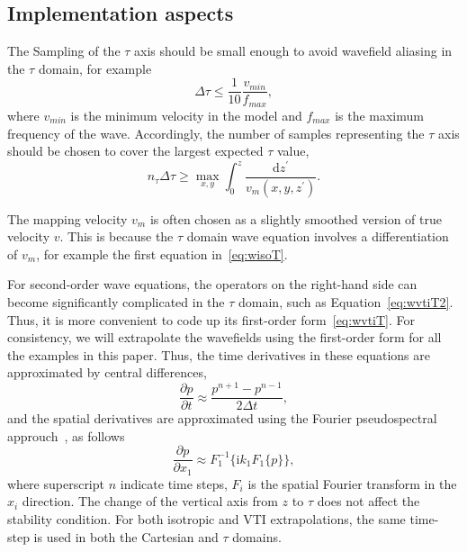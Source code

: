 \subsection{Implementation aspects}

The Sampling of the $\tau$ axis should be small enough to avoid wavefield aliasing in the $\tau$ domain, for example
\begin{equation}
\Delta \tau \leq \frac{1}{10} \frac{v_{min}}{f_{max}} ,
\end{equation}
where $v_{min}$ is the minimum velocity in the model and $f_{max}$ is the maximum frequency of the wave. Accordingly, the number of samples representing the
$\tau$ axis should be chosen to cover the largest expected $\tau$ value,
\begin{equation}
n_\tau \Delta \tau \geq \max_{x,y} \int_0^z \frac{\mathrm{d} z^\prime}{v_m(x,y,z^\prime)} .
\end{equation}

The mapping velocity $v_m$ is often chosen as a slightly smoothed version of true velocity $v$. This is because the $\tau$ domain wave equation involves a differentiation 
of $v_m$, for example the first equation in~\ref{eq:wisoT}.

For second-order wave equations, the operators on the right-hand side can become significantly complicated in the $\tau$ domain, such as Equation~\ref{eq:wvtiT2}.
Thus,  it is more convenient to code up its first-order form~\ref{eq:wvtiT}. For consistency, we will extrapolate the wavefields using the first-order form for all the examples in this paper.
Thus, the time derivatives in these equations are approximated by central differences,
\begin{equation}
\frac{\partial p}{\partial t} \approx \frac{p^{n+1} - p^{n-1}}{2\Delta t},
\end{equation}
and the spatial derivatives are approximated using the Fourier pseudospectral approuch~\cite[]{gazdag:854,carcione:1304}, as follows
\begin{equation}
\frac{\partial p}{\partial x_1} \approx F_1^{-1}\lbrace\mathrm{i} k_1 F_1\lbrace p \rbrace\rbrace,
\end{equation}
where superscript $n$ indicate time steps, $F_i$ is the spatial Fourier transform in the $x_i$ direction.
The change of the vertical axis from $z$ to $\tau$ does not affect the stability condition.
For both isotropic and VTI extrapolations, the same time-step is used in both the Cartesian and $\tau$ domains.

